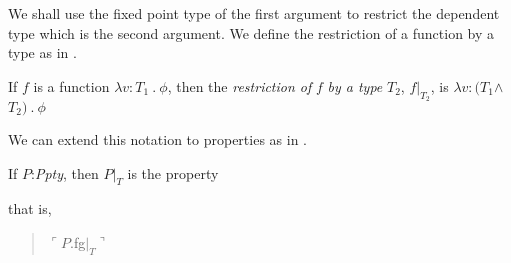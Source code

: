We shall use the fixed point type of the first argument to restrict
the dependent type which is 
the second argument.  We define the restriction of a function by a
type as in \nexteg{}.
\begin{ex} 
If $f$ is a function $\lambda v\!:\!T_1\ .\ \phi$, then the
\textit{restriction of} $f$ \textit{by a type} $T_2$, %
$f|_{T_2}$, 
is $\lambda v\!:\!(T_1$\d{$\wedge$}$T_2)\ .\ \phi$ 
\label{ex:function-restriction} 
\end{ex} 
We can extend this notation to properties as in \nexteg{}.
\begin{ex} 
If $P$:\textit{Ppty}, then $P|_T$ is the property
\begin{quote}
\end{quote}
that is,
\begin{quote}
  $\ulcorner P$.fg$|_T\urcorner$
\end{quote}

    
   
\end{ex} 
  
